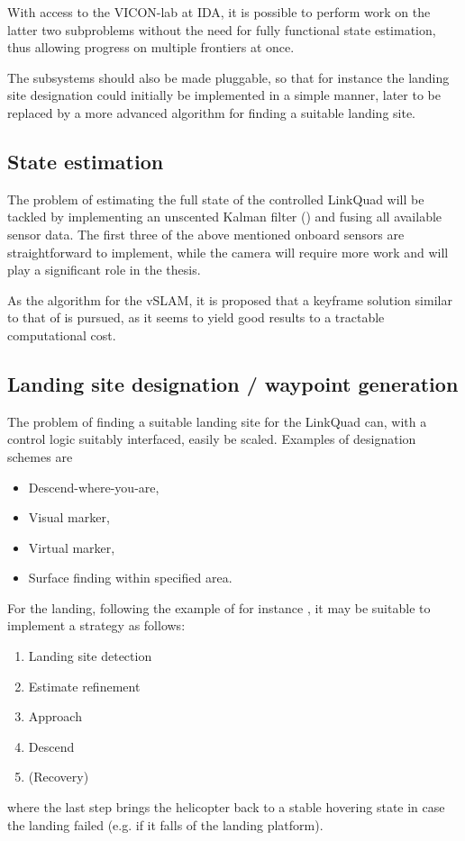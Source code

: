         With access to the VICON-lab at IDA, it is possible to perform
        work on the latter two subproblems without the need for fully
        functional state estimation, thus allowing progress on multiple
        frontiers at once.

        The subsystems should also be made pluggable, so that
        for instance the landing site designation could initially be
        implemented in a simple manner, later
        to be replaced by a more advanced algorithm for finding a suitable
        landing site.

    \subsection{State estimation}
        The problem of estimating the full state of the controlled LinkQuad
        will be tackled by implementing an unscented Kalman filter 
        (\citep{Julier95anewapproach,Julier97anew,vandermerwe:upf,Merwe04sigma-pointkalman}) 
        and fusing all available sensor data.
        The first three of the above mentioned onboard sensors are
        straightforward to implement, while the camera will require more
        work and will play a significant role in the thesis.
        
        As the algorithm for the vSLAM, it is proposed that a keyframe solution
        similar to that of \citep{weiss11monocular} is pursued, as it seems to yield
        good results to a tractable computational cost.

    \subsection{Landing site designation / waypoint generation}
        \label{ssec:waypointgeneration}
        The problem of finding a suitable landing site for the LinkQuad
        can, with a control logic suitably interfaced, easily be scaled.
        Examples of designation schemes are
        \begin{itemize}
            \item Descend-where-you-are,
            \item Visual marker,
            \item Virtual marker,
            \item Surface finding within specified area.
        \end{itemize}

        For the landing, following the example of for instance \citep{brockers:803111,DM:MS:10}, it
        may be suitable to implement a strategy as follows:
        \begin{enumerate}
            \item Landing site detection
            \item Estimate refinement
            \item Approach
            \item Descend
            \item (Recovery)
        \end{enumerate}
        where the last step brings the helicopter back to a stable hovering state
        in case the landing failed (e.g. if it falls of the landing platform).

